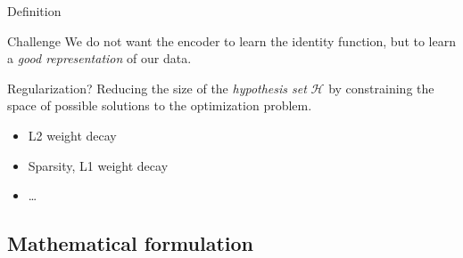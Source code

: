 \documentclass{beamer}
\begin{document}
  \begin{frame}{Definition}


    \begin{alertblock}{Challenge}
      We do not want the encoder to learn the identity function, but to learn a \emph{good representation} of our data.
    \end{alertblock}

    \vspace{0.5cm}

    \begin{block}{Regularization?}
      Reducing the size of the \emph{hypothesis set} $\mathcal{H}$ by constraining the space of possible solutions to the optimization problem.
      \vspace{-0.25cm}
      \begin{itemize}
        \item L2 weight decay
        \item Sparsity, L1 weight decay
        \item \dots
      \end{itemize}
    \end{block}
    
  \end{frame}

  \subsection{Mathematical formulation}
\end{document}
